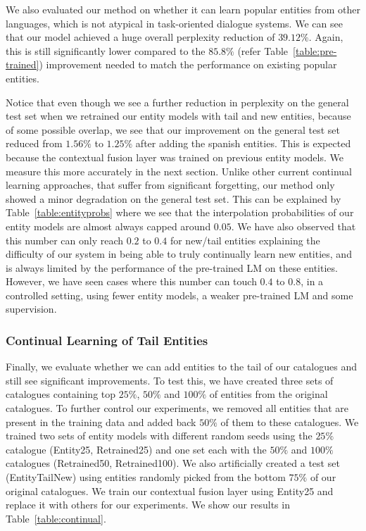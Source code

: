 \documentclass{article}
\begin{document}
We also evaluated our method on whether it can learn popular entities from other languages, which is not atypical in task-oriented dialogue systems. We can see that our model achieved a huge overall perplexity reduction of $39.12\%$. Again, this is still significantly lower compared to the $85.8\%$ (refer Table~\ref{table:pre-trained}) improvement needed to match the performance on existing popular entities.

Notice that even though we see a further reduction in perplexity on the general test set when we retrained our entity models with tail and new entities, because of some possible overlap, we see that our improvement on the general test set reduced from $1.56\%$ to $1.25\%$ after adding the spanish entities. This is expected because the contextual fusion layer was trained on previous entity models. We measure this more accurately in the next section. Unlike other current continual learning approaches, that suffer from significant forgetting, our method only showed a minor degradation on the general test set. This can be explained by Table~\ref{table:entityprobs} where we see that the interpolation probabilities of our entity models are almost always capped around $0.05$. We have also observed that this number can only reach $0.2$ to $0.4$ for new/tail entities explaining the difficulty of our system in being able to truly continually learn new entities, and is always limited by the performance of the pre-trained LM on these entities. However, we have seen cases where this number can touch $0.4$ to $0.8$, in a controlled setting, using fewer entity models, a weaker pre-trained LM and some supervision.


\subsubsection{Continual Learning of Tail Entities}
Finally, we evaluate whether we can add entities to the tail of our catalogues and still see significant improvements. To test this, we have created three sets of catalogues containing top $25\%$, $50\%$ and $100\%$ of entities from the original catalogues. To further control our experiments, we removed all entities that are present in the training data and added back $50\%$ of them to these catalogues. We trained two sets of entity models with different random seeds using the $25\%$ catalogue (Entity25, Retrained25) and one set each with the $50\%$ and $100\%$ catalogues (Retrained50, Retrained100). We also artificially created a test set (EntityTailNew) using entities randomly picked from the bottom $75\%$ of our original catalogues. We train our contextual fusion layer using Entity25 and replace it with others for our experiments. We show our results in Table~\ref{table:continual}.
\end{document}
